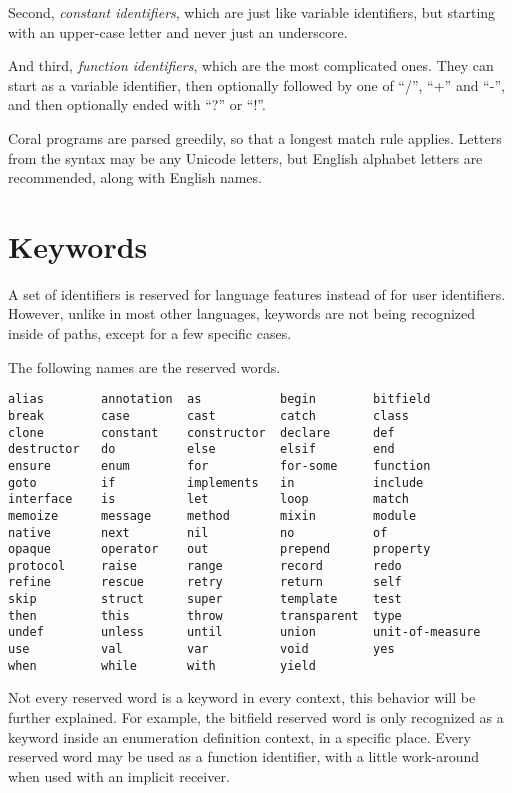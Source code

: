 Second, \textit{constant identifiers}, which are just like variable identifiers, but starting with an upper-case letter and never just an underscore.

And third, \textit{function identifiers}, which are the most complicated ones. They can start as a variable identifier, then optionally followed by one of ``/'', ``+'' and ``-'', and then optionally ended with ``?'' or ``!''.

Coral programs are parsed greedily, so that a longest match rule applies. Letters from the syntax may be any Unicode letters, but English alphabet letters are recommended, along with English names.

\section{Keywords}\label{sec:keywords}

A set of identifiers is reserved for language features instead of for user identifiers. However, unlike in most other languages, keywords are not being recognized inside of paths, except for a few specific cases.

The following names are the reserved words.

\begin{lstlisting}
alias        annotation  as           begin        bitfield
break        case        cast         catch        class
clone        constant    constructor  declare      def
destructor   do          else         elsif        end
ensure       enum        for          for-some     function
goto         if          implements   in           include
interface    is          let          loop         match
memoize      message     method       mixin        module
native       next        nil          no           of
opaque       operator    out          prepend      property
protocol     raise       range        record       redo
refine       rescue      retry        return       self
skip         struct      super        template     test
then         this        throw        transparent  type
undef        unless      until        union        unit-of-measure
use          val         var          void         yes
when         while       with         yield

\end{lstlisting}

Not every reserved word is a keyword in every context, this behavior will be further explained. For example, the bitfield reserved word is only recognized as a keyword inside an enumeration definition context, in a specific place. Every reserved word may be used as a function identifier, with a little work-around when used with an implicit receiver.

